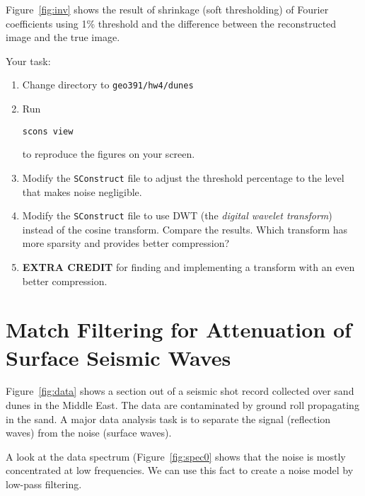 Figure~\ref{fig:inv} shows the result of shrinkage (soft thresholding)
of Fourier coefficients using 1\% threshold and the difference between
the reconstructed image and the true image.

\newpage
Your task:
\begin{enumerate}
\item Change directory to \verb#geo391/hw4/dunes#
\item Run 
\begin{verbatim}
scons view
\end{verbatim}
to reproduce the figures on your screen.
\item Modify the \texttt{SConstruct} file to adjust the threshold percentage to the level that makes noise negligible.
\item  Modify the \texttt{SConstruct} file to use DWT (the \emph{digital wavelet transform}) instead of the cosine transform. 
Compare the results. Which transform has more sparsity and provides better compression? 
\item \textbf{EXTRA CREDIT} for finding and implementing a transform with an even better compression.
\end{enumerate}

\lstset{language=python,numbers=left,numberstyle=\tiny,showstringspaces=false}


\section{Match Filtering for Attenuation of Surface Seismic Waves}


Figure~\ref{fig:data} shows a section out of a seismic shot record
collected over sand dunes in the Middle East. The data are
contaminated by ground roll propagating in the sand. A major data
analysis task is to separate the signal (reflection waves) from the
noise (surface waves).


A look at the data spectrum (Figure~\ref{fig:spec0} shows that the
noise is mostly concentrated at low frequencies. We can use this fact
to create a noise model by low-pass filtering.

